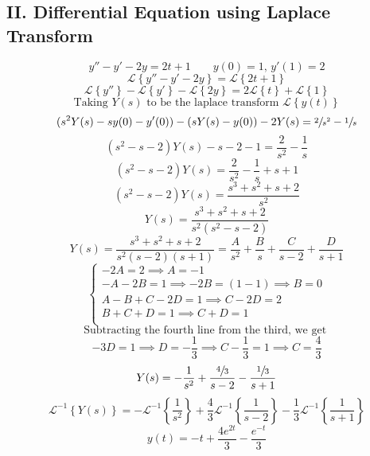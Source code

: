 \documentclass[12pt]{article}
\newcommand{\laplace}[1]{\mathcal{L}\left\{#1\right\}}
\newcommand{\invlaplace}[1]{\mathcal{L}^{-1}\left\{#1\right\}}
\begin{document}
    \subsection*{II. Differential Equation using Laplace Transform}
    \[
        y'' - y' - 2y  = 2t + 1 \qquad y(0) = 1, \, y'(1) = 2
    \]
    \[
        \laplace{y'' - y' - 2y} = \laplace{2t+1}
    \]
    \[
        \laplace{y''} - \laplace{y'} - \laplace{2y} 
        = 2\laplace{t} + \laplace{1}
    \]
    \[
        \text{Taking } Y(s)
        \text{ to be the laplace transform } \laplace{y(t)}
    \]
    \[
        (s^2Y(s) - sy(0) - y'(0))
        - (sY(s) - y(0)) - 2Y(s)
        = \sfrac{2}{s^2} - \sfrac{1}{s}
    \]
    \[
        (s^2-s-2)Y(s) - s - 2 - 1 = \dfrac{2}{s^2} - \dfrac{1}{s}
    \]
    \[
        (s^2-s-2)Y(s) = \dfrac{2}{s^2} - \dfrac{1}{s} + s + 1
    \]
    \[
        (s^2-s-2)Y(s) = \dfrac{s^3 + s^2 + s + 2}{s^2}
    \]
    \[
        Y(s) = \dfrac{s^3 + s^2 + s + 2}{s^2(s^2-s-2)}
    \]
    \[
        Y(s) = \dfrac{s^3 + s^2 + s + 2}{s^2(s-2)(s+1)}
        = \dfrac{A}{s^2} + \dfrac{B}{s} + \dfrac{C}{s-2} + \dfrac{D}{s+1}
    \]
    \[
        \begin{cases}
            -2A = 2 \implies A = -1 \\
            -A - 2B = 1 \implies -2B = (1-1) \implies B = 0 \\
            A - B + C -2D = 1 \implies C - 2D = 2 \\
            B + C + D = 1 \implies C + D = 1 \\
        \end{cases}
    \]
    \[ \text{Subtracting the fourth line from the third, we get } \]
    \[
        -3D = 1 \implies D = -\dfrac{1}{3}
        \implies C - \dfrac{1}{3} = 1 \implies C = \dfrac{4}{3}
    \]
    \[
        Y(s) = -\dfrac{1}{s^2} + \dfrac{\sfrac{4}{3}}{s-2}
        - \dfrac{\sfrac{1}{3}}{s+1}
    \]
    \[
        \invlaplace{Y(s)} = -\invlaplace{\dfrac{1}{s^2}} 
        + \dfrac{4}{3}\invlaplace{\dfrac{1}{s-2}}
        - \dfrac{1}{3}\invlaplace{\dfrac{1}{s+1}}
    \]
    \[
        y(t) = -t + \dfrac{4e^{2t}}{3} - \dfrac{e^{-t}}{3}
    \]

    
\end{document}
